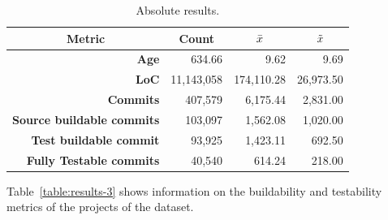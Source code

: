 \begin{table}[!htb]
    \centering
    \caption{Absolute results.}
    \label{table:results-1}
    \begin{tabular}{|r|r|r|r|}
        \hline
        \multicolumn{1}{|c|}{\textbf{Metric}}& \multicolumn{1}{c|}{\textbf{Count}} & \multicolumn{1}{c|}{\textbf{\large{$\bar{x}$}}} & \multicolumn{1}{c|}{\textbf{\large{$\tilde{x}$}}} \\ \hline
        \textbf{Age}                      & 634.66                              & 9.62                               & 9.69                                 \\ \hline
        \textbf{LoC}                      & 11,143,058                         & 174,110.28                          & 26,973.50                             \\ \hline
        \textbf{Commits}                  & 407,579                           & 6,175.44                            & 2,831.00                              \\ \hline
        \textbf{Source buildable commits} & 103,097                           & 1,562.08                            & 1,020.00                              \\ \hline
        \textbf{Test buildable commit}    & 93,925                            & 1,423.11                            & 692.50                               \\ \hline
        \textbf{Fully Testable commits}   & 40,540                            & 614.24                             & 218.00                               \\ \hline
    \end{tabular}
\end{table}

Table~\ref{table:results-3} shows information on the buildability and testability metrics of the projects of the dataset. 

